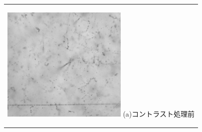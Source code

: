 \documentclass[12pt,a4paper]{jarticle}
\begin{document}
\begin{figure}[htbp]
    \begin{center}
      \begin{tabular}{c}
        \begin{minipage}{0.5\hsize}
          \begin{center}
            \includegraphics[clip, width=60mm]{row.png}
            \hspace{1.6cm} (a)コントラスト処理前
          \end{center}
        \end{minipage}
        

\end{tabular}
\end{center}
\end{figure}
\end{document}
